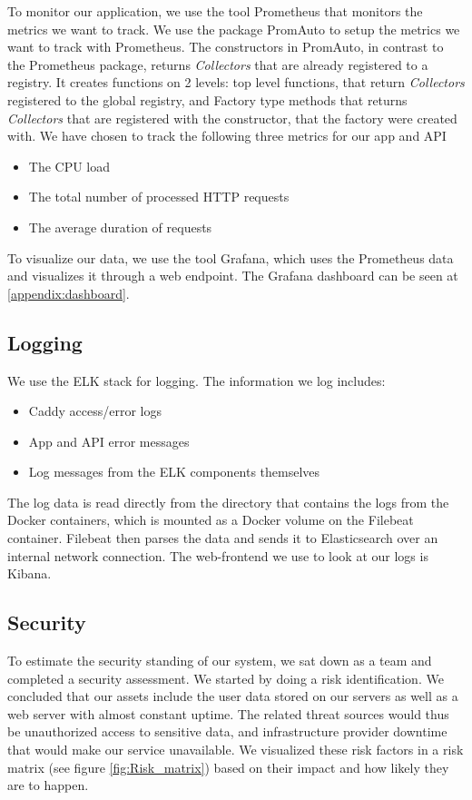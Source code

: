 To monitor our application, we use the tool Prometheus that monitors the metrics we want to track. 
We use the package PromAuto to setup the metrics we want to track with Prometheus. The constructors in PromAuto, in contrast to the Prometheus package, returns \textit{Collectors} that are already registered to a registry. It creates functions on 2 levels: top level functions, that return \textit{Collectors} registered to the global registry, and Factory type methods that returns \textit{Collectors} that are registered with the constructor, that the factory were created with.
\newline
We have chosen to track the following three metrics for our app and API
\begin{itemize}
    \item The CPU load
    \item The total number of processed HTTP requests
    \item The average duration of requests
\end{itemize}

To visualize our data, we use the tool Grafana, which uses the Prometheus data and visualizes it through a web endpoint. The Grafana dashboard can be seen at \ref{appendix:dashboard}.

\subsection{Logging}
We use the ELK stack for logging. The information we log includes:

\begin{itemize}
    \item Caddy access/error logs
    \item App and API error messages
    \item Log messages from the ELK components themselves
\end{itemize}

The log data is read directly from the directory that contains the logs from the Docker containers, which is mounted as a Docker volume on the Filebeat container. Filebeat then parses the data and sends it to Elasticsearch over an internal network connection. The web-frontend we use to look at our logs is Kibana.


\subsection{Security}
To estimate the security standing of our system, we sat down as a team and completed a security assessment. We started by doing a risk identification. We concluded that our assets include the user data stored on our servers as well as a web server with almost constant uptime. The related threat sources would thus be unauthorized access to sensitive data, and infrastructure provider downtime that would make our service unavailable. We visualized these risk factors in a risk matrix (see figure \ref{fig:Risk_matrix}) based on their impact and how likely they are to happen.

